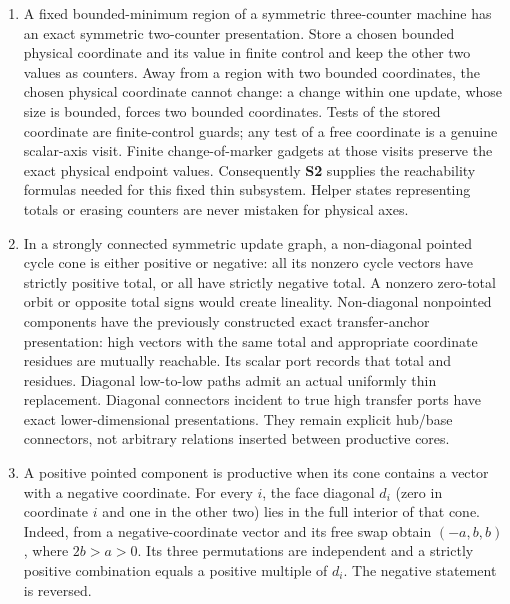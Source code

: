 \documentclass[11pt,a4paper]{article}
\theoremstyle{remark}
\begin{document}
\begin{enumerate}[label=\textup{(\alph*)},leftmargin=*]

\item\label{item:ingredient-a} A fixed bounded-minimum region of a symmetric three-counter machine has an exact symmetric two-counter presentation. Store a chosen bounded physical coordinate and its value in finite control and keep the other two values as counters. Away from a region with two bounded coordinates, the chosen physical coordinate cannot change: a change within one update, whose size is bounded, forces two bounded coordinates. Tests of the stored coordinate are finite-control guards; any test of a free coordinate is a genuine scalar-axis visit. Finite change-of-marker gadgets at those visits preserve the exact physical endpoint values. Consequently \textbf{S2} supplies the reachability formulas needed for this fixed thin subsystem. Helper states representing totals or erasing counters are never mistaken for physical axes.

\item\label{item:ingredient-b} In a strongly connected symmetric update graph, a non-diagonal pointed cycle cone is either positive or negative: all its nonzero cycle vectors have strictly positive total, or all have strictly negative total. A nonzero zero-total orbit or opposite total signs would create lineality. Non-diagonal nonpointed components have the previously constructed exact transfer-anchor presentation: high vectors with the same total and appropriate coordinate residues are mutually reachable. Its scalar port records that total and residues. Diagonal low-to-low paths admit an actual uniformly thin replacement. Diagonal connectors incident to true high transfer ports have exact lower-dimensional presentations. They remain explicit hub/base connectors, not arbitrary relations inserted between productive cores.

\item\label{item:ingredient-c} A positive pointed component is productive when its cone contains a vector with a negative coordinate. For every \(i\), the face diagonal \(d_i\) (zero in coordinate \(i\) and one in the other two) lies in the full interior of that cone. Indeed, from a negative-coordinate vector and its free swap obtain \((-a,b,b)\), where \(2b>a>0\). Its three permutations are independent and a strictly positive combination equals a positive multiple of \(d_i\). The negative statement is reversed.


\end{enumerate}
\end{document}
